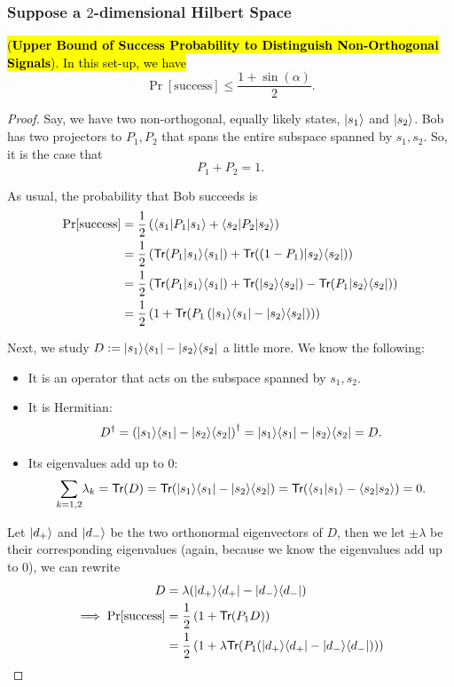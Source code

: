 \documentclass[12pt]{article}
\begin{document}
\subsubsection{Suppose a $2$-dimensional Hilbert Space}
\begin{theorem}\label{thm:ubsp2dno}
\hl{(\textbf{Upper Bound of Success Probability to Distinguish Non-Orthogonal Signals}). In this set-up, we have} $$
\boxed{\Pr[\text{success}]\leq \frac{1+\sin(\alpha)}{2}}.
$$
\end{theorem}
\begin{proof}
Say, we have two non-orthogonal, equally likely states, $\Ket{s_1}$ and $\Ket{s_2}$. Bob has two projectors to $P_1, P_2$ that spans the entire subspace spanned by $s_1, s_2$. So, it is the case that $$
P_1 + P_2 = 1.
$$

\noindent As usual, the probability that Bob succeeds is $$
\begin{aligned}
\Pr[\text{success}]
    &= \frac{1}{2}\prt{\Bra{s_1}P_1\Ket{s_1} + \Bra{s_2}P_2\Ket{s_2}}\\
    &= \frac{1}{2}\prt{\Trace{P_1\Ket{s_1}\Bra{s_1}} + \Trace{(1-P_1)\Ket{s_2}\Bra{s_2}}}\\
    &= \frac{1}{2}\prt{\Trace{P_1\Ket{s_1}\Bra{s_1}} + \Trace{\Ket{s_2}\Bra{s_2}} - \Trace{P_1\Ket{s_2}\Bra{s_2}}}\\
    &= \frac{1}{2}\prt{1 + \Trace{P_1\prt{\kb{s_1}{s_1} - \kb{s_2}{s_2}}}}
\end{aligned}
$$

\noindent Next, we study $
D := \kb{s_1}{s_1} - \kb{s_2}{s_2}
$ a little more. We know the following:
\begin{itemize}
    \item It is an operator that acts on the subspace spanned by $s_1, s_2$.
    \item It is Hermitian: $$
    D^\dag = \prt{\kb{s_1}{s_1} - \kb{s_2}{s_2}}^\dag = \kb{s_1}{s_1} - \kb{s_2}{s_2} = D.
    $$
    \item Its eigenvalues add up to $0$: $$
    \underset{k=1,2}{\sum}\lambda_k = \Trace{D} = \Trace{\kb{s_1}{s_1} - \kb{s_2}{s_2}} = \Trace{\bk{s_1}{s_1} - \bk{s_2}{s_2}} = 0.
    $$
\end{itemize}

\noindent Let $\Ket{d_+}$ and $\Ket{d_-}$ be the two orthonormal eigenvectors of $D$, then we let $\pm \lambda$ be their corresponding eigenvalues (again, because we know the eigenvalues add up to $0$), we can rewrite $$
\begin{aligned}
D
    &= \lambda(\kb{d_+}{d_+} - \kb{d_-}{d_-})\\
\implies
\Pr[\text{success}]
    &= \frac{1}{2}\prt{1 + \Trace{P_1 D}}\\
    &= \frac{1}{2}\prt{1 + \lambda\Trace{P_1 (\kb{d_+}{d_+} - \kb{d_-}{d_-})}}
\end{aligned}
$$


\end{proof}
\end{document}
